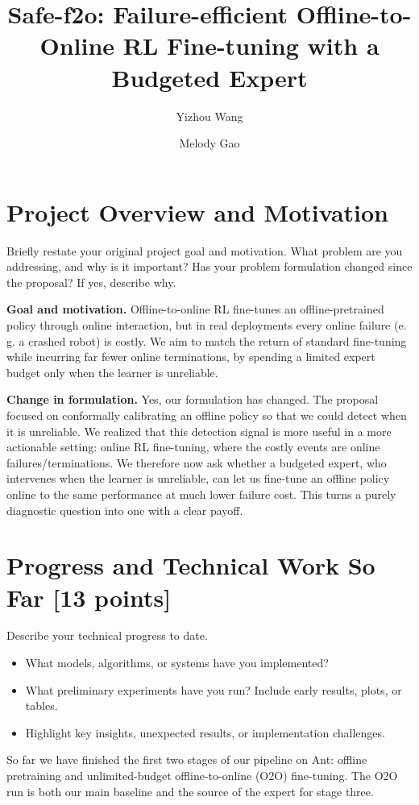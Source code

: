 \documentclass[11pt, letterpaper]{cmu}
\title{Safe-f2o: Failure-efficient Offline-to-Online RL Fine-tuning with a Budgeted Expert}
\author[1]{Yizhou Wang}
\author[1]{Melody Gao}
\affil[1]{Carnegie Mellon University}
\begin{document}
\maketitle

\section{Project Overview and Motivation}
Briefly restate your original project goal and motivation. 
What problem are you addressing, and why is it important? 
Has your problem formulation changed since the proposal? If yes, describe why.

\textbf{Goal and motivation.}
Offline-to-online RL fine-tunes an offline-pretrained policy through online interaction, but in real
deployments every online failure (e. g. a crashed robot) is costly. We aim to match the return
of standard fine-tuning while incurring far fewer online terminations, by spending a limited expert
budget only when the learner is unreliable.

\textbf{Change in formulation.}
Yes, our formulation has changed. The proposal focused on conformally calibrating an offline policy 
so that we could detect when it is unreliable. We realized that this detection signal is more useful 
in a more actionable setting: online RL fine-tuning, where the costly events are online 
failures/terminations. We therefore now ask whether a budgeted 
expert, who intervenes when the learner is unreliable, can let us fine-tune an offline policy 
online to the same performance at much lower failure cost. This turns a purely diagnostic question into 
one with a clear payoff.



\section{Progress and Technical Work So Far [13 points]}
Describe your technical progress to date.
\begin{itemize}
    \item What models, algorithms, or systems have you implemented?
    \item What preliminary experiments have you run? Include early results, plots, or tables.
    \item Highlight key insights, unexpected results, or implementation challenges.
\end{itemize}

So far we have finished the first two stages of our pipeline on Ant: offline pretraining and
unlimited-budget offline-to-online (O2O) fine-tuning. The O2O run is both our main baseline and the
source of the expert for stage three.
\end{document}
